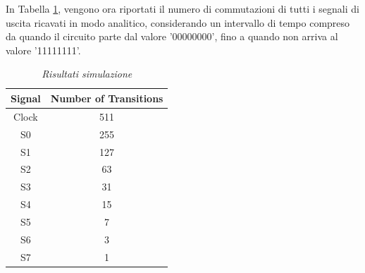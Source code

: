 In Tabella \ref{trans_uscita}, vengono ora riportati il numero di commutazioni di tutti i segnali di uscita ricavati in modo analitico, considerando un intervallo di tempo compreso da quando il circuito parte dal valore '00000000', fino a quando non arriva al valore '11111111'.
\begin{table}[!h]\footnotesize
	\centering
	\begin{tabular}{|c|c|}
		\hline
		\textbf{Signal} & \textbf{Number of Transitions}\\
		\hline
		Clock & 511  \\
		S0 &  255 \\
		S1&127\\
		S2& 63\\
		S3& 31\\
		S4& 15\\
		S5& 7\\
		S6& 3\\
		S7& 1\\
		\hline
	\end{tabular}
	\caption{\textit{Risultati simulazione}}
	\label{trans_uscita}
\end{table}\\

